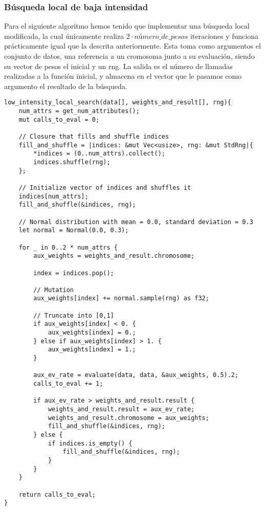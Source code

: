 \documentclass[size=a4, parskip=half, titlepage=false, toc=flat, toc=bib, 12pt]{scrartcl}
\begin{document}
\subsubsection{Búsqueda local de baja intensidad}
Para el siguiente algoritmo hemos tenido que implementar una búsqueda local modificada, la cual únicamente realiza $2\cdot número\_de\_pesos$ iteraciones y funciona prácticamente igual que  la descrita anteriormente. Esta toma como argumentos el conjunto de datos, una referencia a un cromosoma junto a su evaluación, siendo su vector de pesos el inicial y un rng. La salida es el número de llamadas realizadas a la función inicial, y almacena en el vector que le pasamos como argumento el resultado de la búsqueda.

\begin{verbatim}
low_intensity_local_search(data[], weights_and_result[], rng){
    num_attrs = get_num_attributes();
    mut calls_to_eval = 0;

    // Closure that fills and shuffle indices
    fill_and_shuffle = |indices: &mut Vec<usize>, rng: &mut StdRng|{
        *indices = (0..num_attrs).collect();
        indices.shuffle(rng);
    };

    // Initialize vector of indices and shuffles it
    indices[num_attrs];
    fill_and_shuffle(&indices, rng);

    // Normal distribution with mean = 0.0, standard deviation = 0.3
    let normal = Normal(0.0, 0.3);

    for _ in 0..2 * num_attrs {
        aux_weights = weights_and_result.chromosome;

        index = indices.pop();

        // Mutation
        aux_weights[index] += normal.sample(rng) as f32;

        // Truncate into [0,1]
        if aux_weights[index] < 0. {
            aux_weights[index] = 0.;
        } else if aux_weights[index] > 1. {
            aux_weights[index] = 1.;
        }

        aux_ev_rate = evaluate(data, data, &aux_weights, 0.5).2;
        calls_to_eval += 1;

        if aux_ev_rate > weights_and_result.result {
            weights_and_result.result = aux_ev_rate;
            weights_and_result.chromosome = aux_weights;
            fill_and_shuffle(&indices, rng);
        } else {
            if indices.is_empty() {
                fill_and_shuffle(&indices, rng);
            }
        }
    }

    return calls_to_eval;
}

\end{verbatim}
\end{document}

